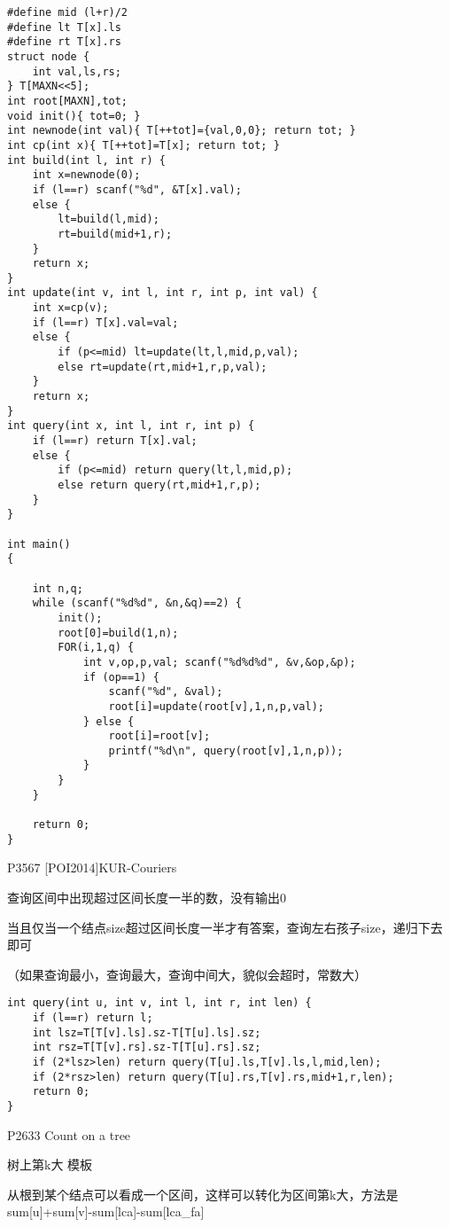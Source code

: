 \begin{lstlisting}
#define mid (l+r)/2
#define lt T[x].ls
#define rt T[x].rs
struct node {
    int val,ls,rs;
} T[MAXN<<5];
int root[MAXN],tot;
void init(){ tot=0; }
int newnode(int val){ T[++tot]={val,0,0}; return tot; }
int cp(int x){ T[++tot]=T[x]; return tot; }
int build(int l, int r) {
    int x=newnode(0);
    if (l==r) scanf("%d", &T[x].val);
    else {
        lt=build(l,mid);
        rt=build(mid+1,r);
    }
    return x;
}
int update(int v, int l, int r, int p, int val) {
    int x=cp(v);
    if (l==r) T[x].val=val;
    else {
        if (p<=mid) lt=update(lt,l,mid,p,val);
        else rt=update(rt,mid+1,r,p,val);
    }
    return x;
}
int query(int x, int l, int r, int p) {
    if (l==r) return T[x].val;
    else {
        if (p<=mid) return query(lt,l,mid,p);
        else return query(rt,mid+1,r,p);
    }
}

int main()
{

    int n,q;
    while (scanf("%d%d", &n,&q)==2) {
        init();
        root[0]=build(1,n);
        FOR(i,1,q) {
            int v,op,p,val; scanf("%d%d%d", &v,&op,&p);
            if (op==1) {
                scanf("%d", &val);
                root[i]=update(root[v],1,n,p,val);
            } else {
                root[i]=root[v];
                printf("%d\n", query(root[v],1,n,p));
            }
        }
    }

    return 0;
}
\end{lstlisting}

P3567 [POI2014]KUR-Couriers

查询区间中出现超过区间长度一半的数，没有输出0

当且仅当一个结点size超过区间长度一半才有答案，查询左右孩子size，递归下去即可

（如果查询最小，查询最大，查询中间大，貌似会超时，常数大）

\begin{lstlisting}
int query(int u, int v, int l, int r, int len) {
    if (l==r) return l;
    int lsz=T[T[v].ls].sz-T[T[u].ls].sz;
    int rsz=T[T[v].rs].sz-T[T[u].rs].sz;
    if (2*lsz>len) return query(T[u].ls,T[v].ls,l,mid,len);
    if (2*rsz>len) return query(T[u].rs,T[v].rs,mid+1,r,len);
    return 0;
}
\end{lstlisting}

P2633 Count on a tree

树上第k大 模板

从根到某个结点可以看成一个区间，这样可以转化为区间第k大，方法是sum[u]+sum[v]-sum[lca]-sum[lca\_fa]

